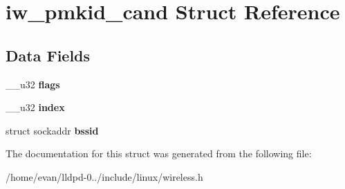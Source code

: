 \section{iw\-\_\-pmkid\-\_\-cand \-Struct \-Reference}
\label{structiw__pmkid__cand}
\subsection*{\-Data \-Fields}
\begin{DoxyCompactItemize}
\item 
\-\_\-\-\_\-u32 {\bfseries flags}\label{structiw__pmkid__cand_a04a0bd666e371f3fab92b8d0ef5dbdb0}

\item 
\-\_\-\-\_\-u32 {\bfseries index}\label{structiw__pmkid__cand_a46394d3427a9a95212a752876917007e}

\item 
struct sockaddr {\bfseries bssid}\label{structiw__pmkid__cand_a183880506ceb65b79693d9daf7875a08}

\end{DoxyCompactItemize}


\-The documentation for this struct was generated from the following file\-:\begin{DoxyCompactItemize}
\item 
/home/evan/lldpd-\/0../include/linux/wireless.\-h\end{DoxyCompactItemize}
